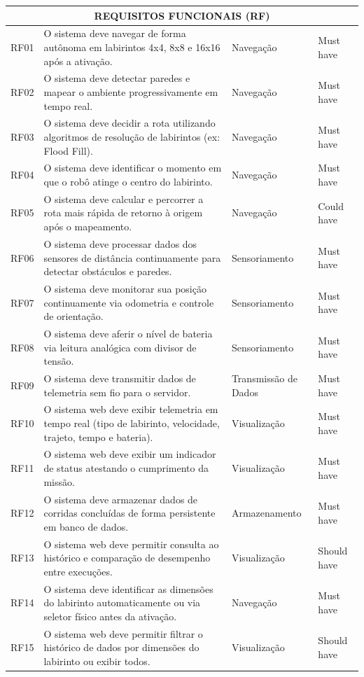 \begin{landscape}
\begin{longtable}{@{\extracolsep{\fill}}|l|p{14.5cm}|l|l|}
        \multicolumn{4}{|c|}{\textbf{REQUISITOS FUNCIONAIS (RF)}} \\ \hline
        RF01 & O sistema deve navegar de forma autônoma em labirintos 4x4, 8x8 e 16x16 após a ativação. & Navegação & Must have \\ \hline
        RF02 & O sistema deve detectar paredes e mapear o ambiente progressivamente em tempo real. & Navegação & Must have \\ \hline
        RF03 & O sistema deve decidir a rota utilizando algoritmos de resolução de labirintos (ex: Flood Fill). & Navegação & Must have \\ \hline
        RF04 & O sistema deve identificar o momento em que o robô atinge o centro do labirinto. & Navegação & Must have \\ \hline
        RF05 & O sistema deve calcular e percorrer a rota mais rápida de retorno à origem após o mapeamento. & Navegação & Could have \\ \hline
        RF06 & O sistema deve processar dados dos sensores de distância continuamente para detectar obstáculos e paredes. & Sensoriamento & Must have \\ \hline
        RF07 & O sistema deve monitorar sua posição continuamente via odometria e controle de orientação. & Sensoriamento & Must have \\ \hline
        RF08 & O sistema deve aferir o nível de bateria via leitura analógica com divisor de tensão. & Sensoriamento & Must have \\ \hline
        RF09 & O sistema deve transmitir dados de telemetria sem fio para o servidor. & Transmissão de Dados & Must have \\ \hline
        RF10 & O sistema web deve exibir telemetria em tempo real (tipo de labirinto, velocidade, trajeto, tempo e bateria). & Visualização & Must have \\ \hline
        RF11 & O sistema web deve exibir um indicador de status atestando o cumprimento da missão. & Visualização & Must have \\ \hline
        RF12 & O sistema deve armazenar dados de corridas concluídas de forma persistente em banco de dados. & Armazenamento & Must have \\ \hline
        RF13 & O sistema web deve permitir consulta ao histórico e comparação de desempenho entre execuções. & Visualização & Should have \\ \hline
        RF14 & O sistema deve identificar as dimensões do labirinto automaticamente ou via seletor físico antes da ativação. & Navegação & Must have \\ \hline
        RF15 & O sistema web deve permitir filtrar o histórico de dados por dimensões do labirinto ou exibir todos. & Visualização & Should have \\ \hline


\end{longtable}
\end{landscape}
